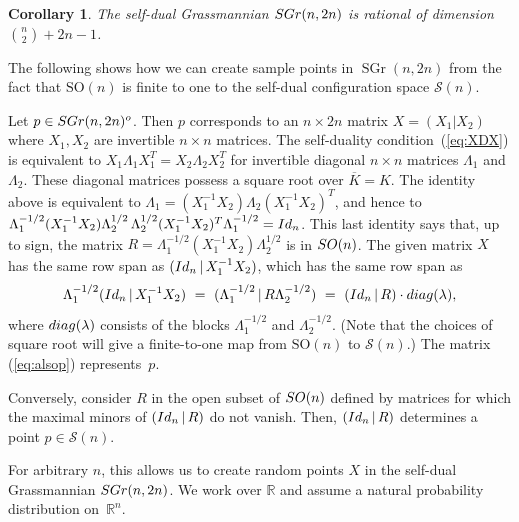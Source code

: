 \documentclass[12pt]{extarticle}
\newtheorem{corollary}[theorem]{Corollary}
\theoremstyle{definition}
\numberwithin{theorem}{section}
\theoremstyle{plain}\newtheorem{ithm}{Theorem}
\newcommand{\RR}{\mathbb{R}}
\DeclareMathOperator{\SGr}{SGr}
\begin{document}
\begin{corollary} \label{cor:rationaldim}
The self-dual Grassmannian
${\rm SGr}(n,2n)$ is  rational 
of dimension $\binom{n}{2}+2n-1$.
\end{corollary}


The following shows how we can create sample points in $\SGr(n,2n)$ from the fact that $\mathrm{SO}(n)$ is finite to one to the self-dual configuration space $\mathcal{S}(n)$.

Let $p \in {\rm SGr}(n,2n)^o$. Then $p$ corresponds to an $n \times 2n$ matrix $X = (X_1| X_2)$ where $X_1, X_2$ are invertible $n \times n$ matrices. The self-duality condition~(\ref{eq:XDX}) 
is equivalent to $X_1 \Lambda_1 X_1^T =  X_2 \Lambda_2 X_2^T$ for invertible 
 diagonal $n \times n$ matrices $\Lambda_1$ and $\Lambda_2$. These diagonal 
matrices possess a square root over $ \overline{K}=K$. The identity above is equivalent 
to $\Lambda_1 = (X_1^{-1} X_2) \Lambda_2 (X_1^{-1} X_2)^T$, and hence to
$\Lambda_1^{-1/2} (X_1^{-1} X_2) \Lambda_2^{1/2} \,\Lambda_2^{1/2} (X_1^{-1} 
X_2)^T \Lambda_1^{-1/2} = {\rm Id}_n$. This last identity says that, up to sign, the  
matrix $R = \Lambda_1^{-1/2} (X_1^{-1} X_2) \Lambda_2^{1/2}$ is in ${\rm SO}(n)$.
The given matrix $X$ has the same row span as 
$({\rm Id}_n \, | \, X_1^{-1} X_2)$, which has the same row span as
\begin{equation} \label{eq:alsop}
 \Lambda_1^{-1/2} ({\rm Id}_n \,| \, X_1^{-1} X_2) \,\,=\,\,( \Lambda_1^{-1/2}
  \,| \,R \Lambda_2^{-1/2})   \,\, = \,\, ( {\rm Id}_n \,| \, R ) \cdot {\rm diag}(\lambda), \end{equation}
where ${\rm diag}(\lambda)$ consists of
the blocks $\Lambda_1^{-1/2}$ and $\Lambda_2^{-1/2}$. 
(Note that the choices of square root will give a finite-to-one map from $\mathrm{SO}(n)$ to $\mathcal{S}(n)$.)
The matrix (\ref{eq:alsop}) represents~$p$. 

Conversely, consider $R$ in the open subset of ${\rm SO}(n)$ defined by matrices for which the maximal minors of  $ ({\rm Id}_n \,| \, R )$ do not vanish. Then,  $ ({\rm Id}_n \,| \, R )$  determines a point $p \in\mathcal{S}(n)$.

For arbitrary $n$,
this
 allows us to create
random points $X$ in
the self-dual Grassmannian ${\rm SGr}(n,2n)$. 
 We work over $\RR$ and assume 
a natural  probability distribution on~$\RR^n$.
\end{document}
